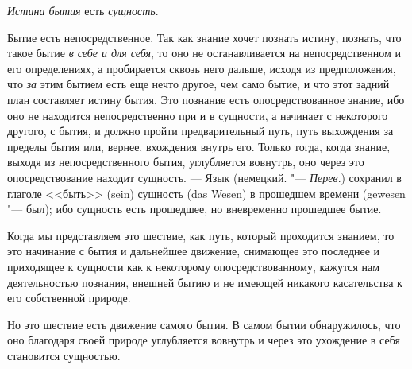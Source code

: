 \clearpage
{\em Истина бытия} есть {\em сущность}.

Бытие есть непосредственное. Так как знание хочет познать истину, познать,
что такое бытие {\em в себе и для себя}, то оно не
останавливается на непосредственном и его определениях, а пробирается
сквозь него дальше, исходя из предположения, что
{\em за} этим бытием есть еще нечто другое, чем само
бытие, и что этот задний план составляет истину бытия. Это познание есть
опосредствованное знание, ибо оно не находится непосредственно при и в
сущности, а начинает с некоторого другого, с бытия, и должно пройти
предварительный путь, путь выхождения за пределы бытия или, вернее,
вхождения внутрь его. Только тогда, когда знание, выходя из
непосредственного бытия, углубляется вовнутрь, оно через это
опосредствование находит сущность. --- Язык (немецкий. "--- {\em Перев}.)
сохранил в глаголе <<быть>> (sein) сущность (das Wesen) в прошедшем времени
(gewesen "--- был); ибо сущность есть прошедшее, но вневременно прошедшее
бытие.

Когда мы представляем это шествие, как путь, который проходится знанием, то
это начинание с бытия и дальнейшее движение, снимающее это последнее и
приходящее к сущности как к некоторому опосредствованному, кажутся нам
деятельностью познания, внешней бытию и не имеющей никакого касательства к
его собственной природе.

Но это шествие есть движение самого бытия. В самом бытии обнаружилось, что
оно благодаря своей природе углубляется вовнутрь и через это ухождение в
себя становится сущностью.

